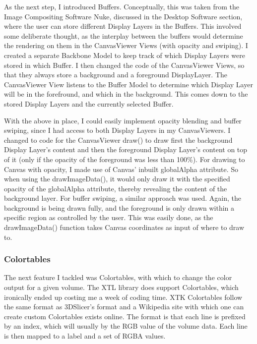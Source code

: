 \documentclass[a4paper,11pt,twoside]{article}
\begin{document}
As the next step, I introduced Buffers. Conceptually, this was taken from the Image Compositing Software Nuke, discussed in the Desktop Software section, where the user can store different Display Layers in the Buffers. This involved some deliberate thought, as the interplay between the buffers would determine the rendering on them in the CanvasViewer Views (with opacity and swiping). I created a separate Backbone Model to keep track of which Display Layers were stored in which Buffer. I then changed the code of the CanvasViewer Views, so that they always store a background and a foreground DisplayLayer. The CanvasViewer View listens to the Buffer Model to determine which Display Layer will be in the forefround, and which in the background. This comes down to the stored Display Layers and the currently selected Buffer. 

With the above in place, I could easily implement opacity blending and buffer swiping, since I had access to both Display Layers in my CanvasViewers. I changed to code for the CanvasViewer draw() to draw first the background Display Layer's content and then the foreground Display Layer's content on top of it (only if the opacity of the foreground was less than 100\%). For drawing to Canvas with opacity, I made use of Canvas' inbuilt globalAlpha attribute. So when using the drawImageData(), it would only draw it with the specified opacity of the globalAlpha attribute, thereby revealing the content of the background layer. For buffer swiping, a similar approach was used. Again, the background is being drawn fully, and the foreground is only drawn within a specific region as controlled by the user. This was easily done, as the drawImageData() function takes Canvas coordinates as input of where to draw to. 




\subsubsection{Colortables}

The next feature I tackled was Colortables, with which to change the color output for a given volume. The XTL library does support Colortables, which ironically ended up costing me a week of coding time. XTK Colortables follow the same format as 3DSlicer's format and a Wikipedia site with which one can create custom Colortables exists online. The format is that each line is prefixed by an index, which will usually by the RGB value of the volume data. Each line is then mapped to a label and a set of RGBA values.
\end{document}
